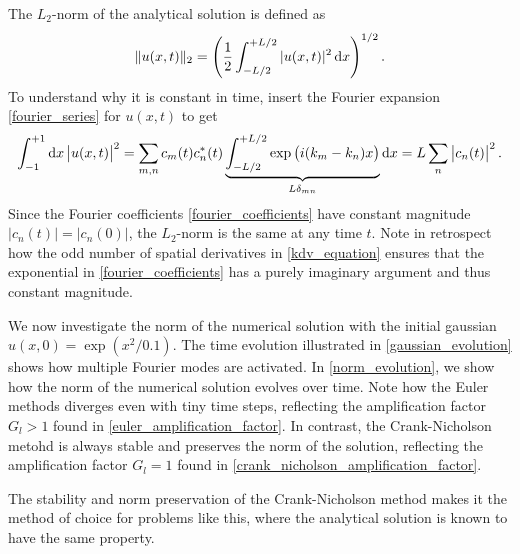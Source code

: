 The $L_2$-norm of the analytical solution is defined as
\begin{equation*}
	\Vert u(x,t) \Vert_2 = \left( \frac{1}{2} \int_{-L/2}^{+L/2} |u(x,t)|^2 \dif x \right)^{1/2}.
\end{equation*}
To understand why it is constant in time, insert the Fourier expansion \cref{fourier_series} for $u(x,t)$ to get
\begin{equation*}
\int_{-1}^{+1} \dif x \left| u(x,t) \right|^2 = \sum_{m,n} c_m(t) c_n^*(t) \underbrace{\int_{-L/2}^{+L/2} \exp{\left(i(k_m-k_n)x\right)}}_{L \delta_{m n}} \dif x = L \sum_n \left| c_n(t) \right|^2.
\end{equation*}
Since the Fourier coefficients \cref{fourier_coefficients} have constant magnitude $|c_n(t)| = |c_n(0)|$, the $L_2$-norm is the same at any time $t$.
Note in retrospect how the odd number of spatial derivatives in \cref{kdv_equation} ensures that the exponential in \cref{fourier_coefficients} has a purely imaginary argument and thus constant magnitude.

We now investigate the norm of the numerical solution with the initial gaussian $u(x, 0) = \exp \left( x^2 / 0.1 \right)$.
The time evolution illustrated in \cref{gaussian_evolution} shows how multiple Fourier modes are activated.
In \cref{norm_evolution}, we show how the norm of the numerical solution evolves over time.
Note how the Euler methods diverges even with tiny time steps, reflecting the amplification factor $G_l > 1$ found in \cref{euler_amplification_factor}.
In contrast, the Crank-Nicholson metohd is always stable and preserves the norm of the solution, reflecting the amplification factor $G_l = 1$ found in \cref{crank_nicholson_amplification_factor}.

The stability and norm preservation of the Crank-Nicholson method makes it the method of choice for problems like this, where the analytical solution is known to have the same property.


